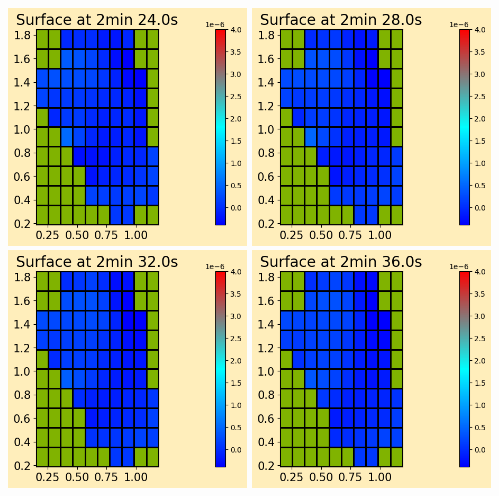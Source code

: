 \documentclass[11pt]{article}
\begin{document}
\vskip 10pt 
\includegraphics[width=0.475\textwidth]{frame0036fig0.png}
\vskip 10pt 
\includegraphics[width=0.475\textwidth]{frame0037fig0.png}
\vskip 10pt 
\includegraphics[width=0.475\textwidth]{frame0038fig0.png}
\vskip 10pt 
\includegraphics[width=0.475\textwidth]{frame0039fig0.png}
\end{document}
